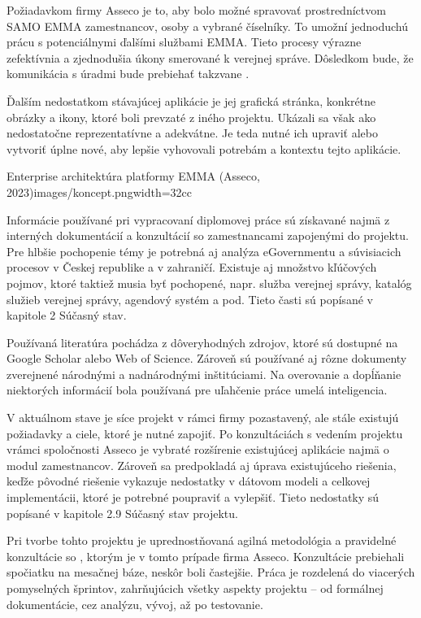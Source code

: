 Požiadavkom firmy Asseco je to, aby bolo možné spravovať prostredníctvom SAMO EMMA zamestnancov, osoby a vybrané číselníky. To umožní jednoduchú prácu s potenciálnymi ďalšími službami EMMA.  Tieto procesy výrazne zefektívnia a zjednodušia úkony smerované k verejnej správe. Dôsledkom bude, že komunikácia s úradmi bude prebiehať takzvane .

Ďalším nedostatkom stávajúcej aplikácie je jej grafická stránka, konkrétne obrázky a ikony, ktoré boli prevzaté z iného projektu. Ukázali sa však ako nedostatočne reprezentatívne a adekvátne. Je teda nutné ich upraviť alebo vytvoriť úplne nové, aby lepšie vyhovovali potrebám a kontextu tejto aplikácie.


{Enterprise architektúra platformy EMMA  (Asseco, 2023)}{images/koncept.png}{width=32cc}


Informácie používané pri vypracovaní diplomovej práce sú získavané najmä z interných dokumentácií a konzultácií so zamestnancami zapojenými do projektu. Pre hlbšie pochopenie témy je potrebná aj analýza eGovernmentu a súvisiacich procesov v Českej republike a v zahraničí. Existuje aj množstvo kľúčových pojmov, ktoré taktiež musia byť pochopené, napr. služba verejnej správy, katalóg služieb verejnej správy, agendový systém a pod. Tieto časti sú popísané v kapitole 2 Súčasný stav.

Používaná literatúra pochádza z dôveryhodných zdrojov, ktoré sú dostupné na Google Scholar alebo Web of Science. Zároveň sú používané aj rôzne dokumenty zverejnené národnými a nadnárodnými inštitúciami. Na overovanie a dopĺňanie niektorých informácií bola používaná pre uľahčenie práce umelá inteligencia.

V aktuálnom stave je síce projekt v rámci firmy pozastavený, ale stále existujú požiadavky a ciele, ktoré je nutné zapojiť. Po konzultáciách s vedením projektu vrámci spoločnosti Asseco je vybraté rozšírenie existujúcej aplikácie najmä o modul zamestnancov. Zároveň sa predpokladá aj úprava existujúceho riešenia, keďže pôvodné riešenie vykazuje nedostatky v dátovom modeli a celkovej implementácii, ktoré je potrebné poupraviť a vylepšiť. Tieto nedostatky sú popísané v kapitole 2.9 Súčasný stav projektu.

Pri tvorbe tohto projektu je uprednostňovaná agilná metodológia a pravidelné konzultácie so , ktorým je v tomto prípade firma Asseco. Konzultácie prebiehali spočiatku na mesačnej báze, neskôr boli častejšie. Práca je rozdelená do viacerých pomyselných šprintov, zahrňujúcich všetky aspekty projektu -- od formálnej dokumentácie, cez analýzu, vývoj, až po testovanie.

